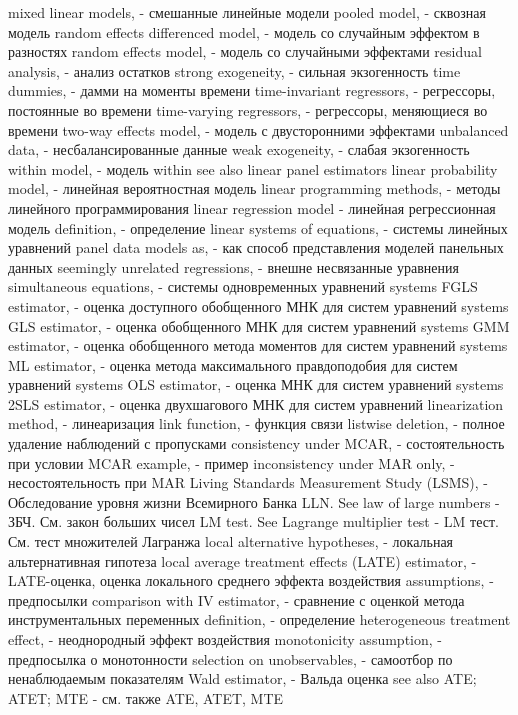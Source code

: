 mixed linear models, - смешанные линейные модели
pooled model, - сквозная модель
random effects differenced model, - модель со случайным эффектом в разностях
random effects model, - модель со случайными эффектами
residual analysis, - анализ остатков
strong exogeneity, - сильная экзогенность
time dummies, - дамми на моменты времени
time-invariant regressors, - регрессоры, постоянные во времени
time-varying regressors, - регрессоры, меняющиеся во времени
two-way effects model, - модель с двусторонними эффектами
unbalanced data, - несбалансированные данные
weak exogeneity, - слабая экзогенность
within model, - модель within
see also linear panel estimators
linear probability model, - линейная вероятностная модель
linear programming methods, - методы линейного программирования
linear regression model - линейная регрессионная модель
definition, - определение
linear systems of equations, - системы линейных уравнений
panel data models as, - как способ представления моделей панельных данных
seemingly unrelated regressions, - внешне несвязанные уравнения
simultaneous equations, - системы одновременных уравнений
systems FGLS estimator, - оценка доступного обобщенного МНК для систем уравнений
systems GLS estimator, - оценка обобщенного МНК для систем уравнений
systems GMM estimator, - оценка обобщенного метода моментов для систем уравнений
systems ML estimator, - оценка  метода максимального правдоподобия для систем уравнений
systems OLS estimator, - оценка МНК для систем уравнений
systems 2SLS estimator, - оценка двухшагового МНК для систем уравнений
linearization method, - линеаризация
link function, - функция связи
listwise deletion, - полное удаление наблюдений с пропусками
consistency under MCAR, - состоятельность при условии MCAR
example, - пример
inconsistency under MAR only, - несостоятельность при MAR
Living Standards Measurement Study (LSMS), - Обследование уровня жизни Всемирного Банка
LLN. See law of large numbers - ЗБЧ. См. закон больших чисел
LM test. See Lagrange multiplier test - LM тест. См. тест множителей Лагранжа
local alternative hypotheses, - локальная альтернативная гипотеза
local average treatment effects (LATE) estimator, - LATE-оценка, оценка локального среднего эффекта воздействия
assumptions, - предпосылки
comparison with IV estimator, - сравнение с оценкой метода инструментальных переменных
definition, - определение
heterogeneous treatment effect, - неоднородный эффект воздействия
monotonicity assumption, - предпосылка о монотонности
selection on unobservables, - самоотбор по ненаблюдаемым показателям
Wald estimator, - Вальда оценка
see also ATE; ATET; MTE - см. также ATE, ATET, MTE
